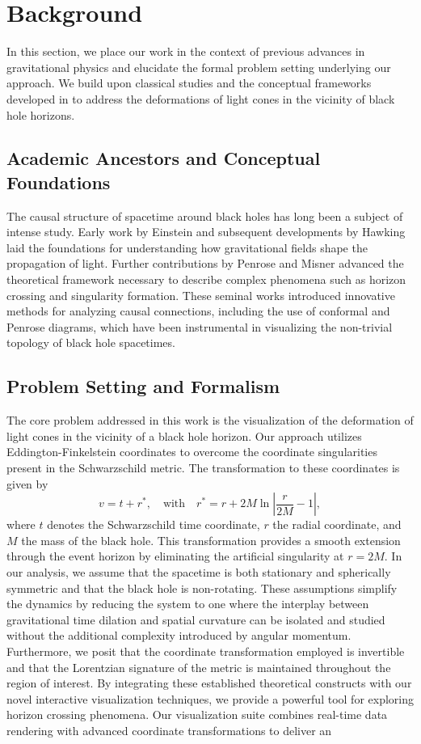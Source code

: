 \documentclass{article}
\begin{document}
\section{Background} In this section, we place our work in the context of previous advances in gravitational physics and elucidate the formal problem setting underlying our approach. We build upon classical studies and the conceptual frameworks developed in \cite{Einstein1916, Hawking1973, Penrose1965, Misner1973} to address the deformations of light cones in the vicinity of black hole horizons.  \subsection{Academic Ancestors and Conceptual Foundations} The causal structure of spacetime around black holes has long been a subject of intense study. Early work by Einstein \cite{Einstein1916} and subsequent developments by Hawking \cite{Hawking1973} laid the foundations for understanding how gravitational fields shape the propagation of light. Further contributions by Penrose \cite{Penrose1965} and Misner \cite{Misner1973} advanced the theoretical framework necessary to describe complex phenomena such as horizon crossing and singularity formation. These seminal works introduced innovative methods for analyzing causal connections, including the use of conformal and Penrose diagrams, which have been instrumental in visualizing the non-trivial topology of black hole spacetimes.  \subsection{Problem Setting and Formalism} The core problem addressed in this work is the visualization of the deformation of light cones in the vicinity of a black hole horizon. Our approach utilizes Eddington-Finkelstein coordinates to overcome the coordinate singularities present in the Schwarzschild metric. The transformation to these coordinates is given by \begin{equation} v = t + r^*, \quad \text{with} \quad r^* = r + 2M \ln\left|\frac{r}{2M} - 1\right|,  \end{equation} where $t$ denotes the Schwarzschild time coordinate, $r$ the radial coordinate, and $M$ the mass of the black hole. This transformation provides a smooth extension through the event horizon by eliminating the artificial singularity at $r = 2M$.  In our analysis, we assume that the spacetime is both stationary and spherically symmetric and that the black hole is non-rotating. These assumptions simplify the dynamics by reducing the system to one where the interplay between gravitational time dilation and spatial curvature can be isolated and studied without the additional complexity introduced by angular momentum. Furthermore, we posit that the coordinate transformation employed is invertible and that the Lorentzian signature of the metric is maintained throughout the region of interest.  By integrating these established theoretical constructs with our novel interactive visualization techniques, we provide a powerful tool for exploring horizon crossing phenomena. Our visualization suite combines real-time data rendering with advanced coordinate transformations to deliver an 
\end{document}
